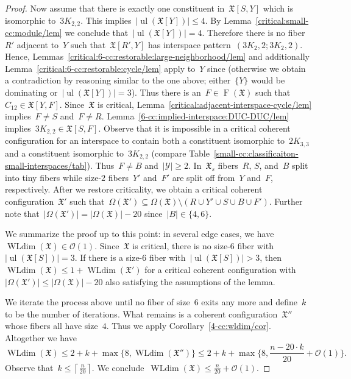 \documentclass[english,a4paper]{article}
\theoremstyle{plain}
\theoremstyle{definition}
\newcommand{\abs}[1]{| #1 |}
\DeclareMathOperator{\Fibers}{F}
\newcommand{\coherentConfig}{\ensuremath{\mathfrak{X}}}
\newcommand{\fibers}[1]{\ensuremath{\Fibers \left( #1 \right)}}
\newcommand{\interspace}[2]{\ensuremath{\coherentConfig[#1,#2]}}
\newcommand{\inducedCC}[1]{\ensuremath{\coherentConfig[#1]}}
\DeclareMathOperator*{\ul}{ul}
\newcommand{\vertices}{\ensuremath{\Omega}}
\DeclareMathOperator*{\WLdim}{WLdim}
\newcommand{\wldim}[1]{\ensuremath{\WLdim\left(#1\right)}}
\newcommand{\ipsixMatchingMatching}     {\ensuremath{(\disjointCliques{3}{2},2;\disjointCliques{3}{2},2)}}
\newcommand{\clique}[1]{\ensuremath{K_{#1}}}
\newcommand{\cycle}[1]{\ensuremath{C_{#1}}}
\newcommand{\disjointCliques}[2]{\ensuremath{#1 \clique{#2}}}
\begin{document}
\begin{proof}
    Now assume that there is exactly one constituent in~$\interspace{S}{Y}$ which is isomorphic to~$\disjointCliques{3}{2,2}$.
    This implies~$|\ul(\inducedCC{Y})| \leq 4$.
    By Lemma~\ref{critical:small-cc:module/lem} we conclude that~$|\ul(\inducedCC{Y})| = 4$.
    Therefore there is no fiber~$R'$ adjacent to~$Y$ such that~$\interspace{R'}{Y}$ has interspace pattern~$\ipsixMatchingMatching$.
    Hence, Lemmas~\ref{critical:6-cc:restorable:large-neighborhood/lem} and additionally Lemma~\ref{critical:6-cc:restorable:cycle/lem} apply to~$Y$ since (otherwise we obtain a contradiction by reasoning similar to the one above; either~$\{Y\}$ would be dominating or~$|\ul(\inducedCC{Y})|=3$).
    Thus there is an~$F \in \fibers{\coherentConfig}$ such that~$\cycle{12} \in \interspace{Y}{F}$.
    Since~$\coherentConfig$ is critical, Lemma~\ref{critical:adjacent-interspace-cycle/lem} implies~$F \neq S$ and~$F \neq R$.
    Lemma~\ref{6-cc:implied-interspace:DUC-DUC/lem} implies~$\disjointCliques{3}{2,2} \in \interspace{S}{F}$.
    Observe that it is impossible in a critical coherent configuration for an interspace to contain both a constituent isomorphic to~$\disjointCliques{2}{3,3}$ and a constituent isomorphic to~$\disjointCliques{3}{2,2}$ (compare Table~\ref{small-cc:classificaiton-small-interspaces/tab}).
    Thus~$F \neq B$ and~$|\mathcal{Y}| \geq 2$.
    In~$\coherentConfig_s$ fibers~$R$, $S$, and~$B$ split into tiny fibers while size-$2$ fibers~$Y'$ and~$F'$ are split off from~$Y$ and~$F$, respectively.
    After we restore criticality, we obtain a critical coherent configuration~$\coherentConfig'$ such that~$\vertices(\coherentConfig') \subseteq \vertices(\coherentConfig) \setminus (R \cup Y' \cup S \cup B \cup F')$.
    Further note that~$\abs{\vertices(\coherentConfig')} = \abs{\vertices(\coherentConfig)} - 20$ since~$\abs{B} \in \{4,6\}$.

    We summarize the proof up to this point:
    in several edge cases, we have~$\wldim{\coherentConfig} \in \mathcal{O}(1)$.
    Since~$\coherentConfig$ is critical, there is no size-$6$ fiber with~$\abs{\ul(\inducedCC{S})} = 3$.
    If there is a size-$6$ fiber with~$\abs{\ul(\inducedCC{S})} > 3$, then $\wldim{\coherentConfig} \leq   1 + \wldim{\coherentConfig'}$ for a critical coherent configuration with~$\abs{\vertices(\coherentConfig')} \leq \abs{\vertices(\coherentConfig)} - 20$ also satisfying the assumptions of the lemma.

    We iterate the process above until no fiber of size~$6$ exits any more and define~$k$ to be the number of iterations.
    What remains is a coherent configuration~$\coherentConfig''$ whose fibers all have size~$4$.
    Thus we apply Corollary~\ref{4-cc:wldim/cor}.
    Altogether we have
    \[
        \wldim{\coherentConfig} \leq 2+ k + \max \{8, \wldim{\coherentConfig''}\} \leq 2 + k + \max\{8, \frac{n - 20 \cdot k}{20} + \mathcal{O}(1)\}.
    \]
    Observe that~$k \leq \left\lceil \frac{n}{20} \right\rceil$.
    We conclude~$\wldim{\coherentConfig} \leq \frac{n}{20} + \mathcal{O}(1)$.
\end{proof}
\end{document}
